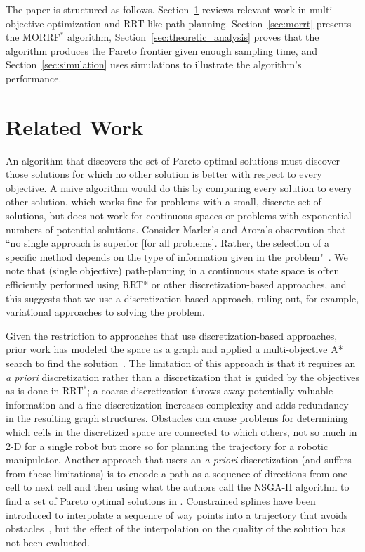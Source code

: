 \documentclass{article}
\begin{document}
The paper is structured as follows.  
Section~\ref{sec:related_works} reviews relevant work in multi-objective optimization and RRT-like path-planning. 
Section~\ref{sec:morrt} presents the MORRF$^{*}$ algorithm,  
Section~\ref{sec:theoretic_analysis} proves that the algorithm produces the Pareto frontier given enough sampling time, 
and Section~\ref{sec:simulation} uses simulations to illustrate the algorithm's performance.

\section{Related Work}
\label{sec:related_works}

An algorithm that discovers the set of Pareto optimal solutions must discover those solutions for which no other solution is better with respect to every objective.  A naive algorithm would do this by comparing every solution to every other solution, which works fine for problems with a small, discrete set of solutions, but does not work for continuous spaces or problems with exponential numbers of potential solutions.  
Consider Marler's and Arora's observation that ``no single approach is superior [for all problems].  
Rather, the selection of a specific method depends on the type of information given in the problem"~\cite{marler2004survey}.  
We note that (single objective) path-planning in a continuous state space is often efficiently performed using RRT* or other discretization-based approaches, and this suggests that we use a discretization-based approach, ruling out, for example, variational approaches to solving the problem.    

Given the restriction to approaches that use discretization-based approaches, prior work has modeled the space as a graph and applied a multi-objective A* search to find the solution~\cite{Mandow:2005:NAM:1642293.1642328}. 
The limitation of this approach is that it requires an {\em a priori} discretization rather than a discretization that is guided by the objectives as is done in RRT$^{*}$; a coarse discretization throws away potentially valuable information and a fine discretization increases complexity and adds redundancy in the resulting graph structures.
Obstacles can cause problems for determining which cells in the discretized space are connected to which others, not so much in 2-D for a single robot but more so for planning the trajectory for a robotic manipulator.
Another approach that users an {\em a priori} discretization (and suffers from these limitations) is to encode a path as a sequence of directions from one cell to next cell and then using what the authors call the NSGA-II algorithm to find a set of Pareto optimal solutions in \cite{Ahmed2013}.  
Constrained splines have been introduced to interpolate a sequence of way points into a trajectory that avoids obstacles~\cite{6181426}, but the effect of the interpolation on the quality of the solution has not been evaluated.
\end{document}
